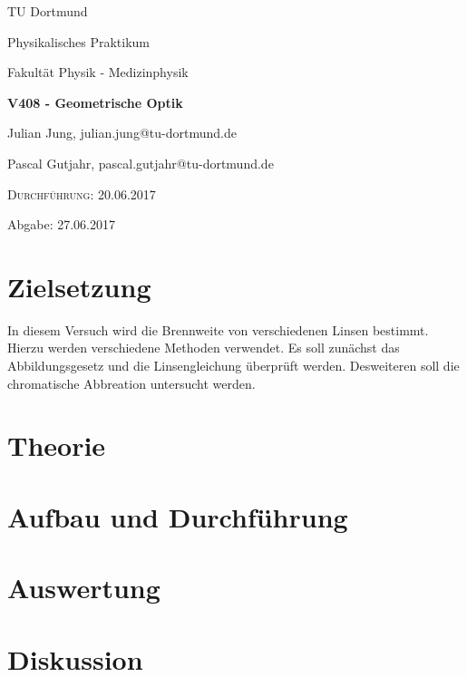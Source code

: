 


\begin{titlepage}
  \centering
  {\LARGE TU Dortmund \par}
  \vspace{0.75cm}
  {\Large Physikalisches Praktikum \par}
  \vspace{0.75cm}
  {\Large Fakultät Physik - Medizinphysik \par}
  \vspace{4cm}
  {\LARGE \bfseries V408 - Geometrische Optik \par}
  \vspace{4cm}
  {\large Julian Jung, julian.jung@tu-dortmund.de \par \vspace{0.25cm}
  Pascal Gutjahr, pascal.gutjahr@tu-dortmund.de \par}
  \vspace{6cm}
  {\scshape Durchführung: 20.06.2017 \par \vspace{0.25cm}
  Abgabe: 27.06.2017 \par \vspace{0.25cm}}
\end{titlepage}
\tableofcontents
\newpage
\section{Zielsetzung}
In diesem Versuch wird die Brennweite von verschiedenen Linsen bestimmt. Hierzu
werden verschiedene Methoden verwendet.
Es soll zunächst das Abbildungsgesetz und die Linsengleichung überprüft werden.
Desweiteren soll die chromatische Abbreation untersucht werden.
\section{Theorie}
 
\section{Aufbau und Durchführung}
 
\section{Auswertung}
 
\section{Diskussion}

\printbibliography


